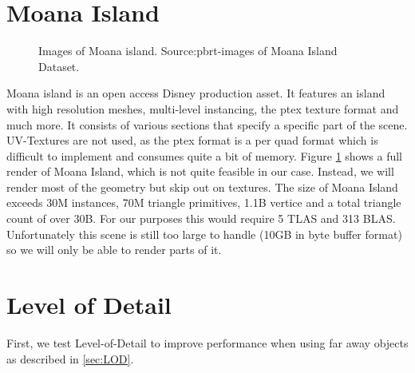 \section{Moana Island}
\begin{figure}
    \centering
    \caption{Images of Moana island. Source:pbrt-images of Moana Island Dataset.}
    \label{fig:moanaPBRTRender}
\end{figure}
Moana island\cite{moanaIsland} is an open access Disney production asset. It features an island with high resolution meshes, multi-level instancing, the ptex texture format and much more. It consists of various sections that specify a specific part of the scene. UV-Textures are not used, as the ptex format is a per quad format which is difficult to implement and consumes quite a bit of memory. Figure \ref{fig:moanaPBRTRender} shows a full render of Moana Island, which is not quite feasible in our case. Instead, we will render most of the geometry but skip out on textures. The size of Moana Island exceeds 30M instances, 70M triangle primitives, 1.1B vertice and a total triangle count of over 30B. For our purposes this would require 5 TLAS and 313 BLAS. Unfortunately this scene is still too large to handle (10GB in byte buffer format) so we will only be able to render parts of it.
\newpage
\section{Level of Detail}
\label{sec:LODTEST}
First, we test Level-of-Detail to improve performance when using far away objects as described in \ref{sec:LOD}.
